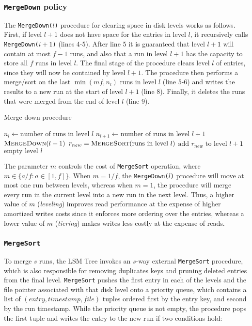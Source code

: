 \documentclass{acm}
\begin{document}
\subsubsection{\texttt{MergeDown} policy}

The \texttt{MergeDown($l$)} procedure for clearing space in disk levels works as follows. First, if level $l+1$ does not have space for the entries in level $l$, it recursively calls \texttt{MergeDown($i+1$)} (lines 4-5). After line 5 it is guaranteed that level $l+1$ will contain at most $f-1$ runs, and also that a run in level $l+1$ has the capacity to store all $f$ runs in level $l$. The final stage of the procedure clears level $l$ of entries, since they will now be contained by level $l+1$. The procedure then performs a merge/sort on the last $\min(mf, n_l)$ runs in level $l$ (line 5-6) and writes the results to a new run at the start of level $l+1$ (line 8). Finally, it deletes the runs that were merged from the end of level $l$ (line 9).

\begin{algorithm}
\caption{Merge down procedure}
\begin{algorithmic}[1]
\State $n_l \gets \text{number of runs in level } l$
\State $n_{l+1} \gets \text{number of runs in level } l+1$
\Return
\EndIf
{}
\State $\Call{MergeDown}{l+1}$
\EndIf
\State $r_{new} = \Call{MergeSort}{\text{runs in level } l}$
\State $\text{add } r_{new} \text{ to level } l + 1$
\State $\text{empty level } l$
\EndProcedure
\end{algorithmic}
\end{algorithm}


The parameter $m$ controls the cost of \texttt{MergeSort} operation, where $m \in \{a/f : a \in [1, f] \}$. When $m=1/f$, the \texttt{MergeDown($l$)} procedure will move at most one run between levels, whereas when $m=1$, the procedure will merge every run in the current level into a new run in the next level. Thus, a higher value of $m$ (\textit{leveling}) improves read performance at the expense of higher amortized writes costs since it enforces more ordering over the entries, whereas a lower value of $m$ (\textit{tiering}) makes writes less costly at the expense of reads.

\subsubsection{\texttt{MergeSort}}

To merge $s$ runs, the LSM Tree invokes an $s$-way external \texttt{MergeSort} procedure, which is also responsible for removing duplicates keys and pruning deleted entries from the final level. \texttt{MergeSort} pushes the first entry in each of the levels and the file pointer associated with that disk level onto a priority queue, which contains a list of $(entry, timestamp, file)$ tuples ordered first by the entry key, and second by the run timestamp. While the priority queue is not empty, the procedure pops the first tuple and writes the entry to the new run if two conditions hold:
\end{document}
